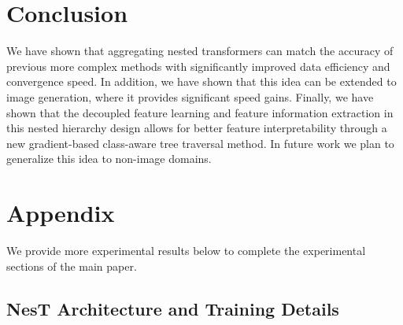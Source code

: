 \documentclass{article}
\newcommand{\OURS}{NesT\xspace}
\begin{document}
\section{Conclusion}
\label{sec:conclusion}
We have shown that aggregating nested transformers can match the accuracy of previous more complex methods with significantly improved data efficiency and convergence speed. 
In addition, we have shown that this idea can be extended to image generation, where it provides significant speed gains.
Finally, we have shown that the decoupled feature learning and feature information extraction in this nested hierarchy design allows for better feature interpretability through a new gradient-based class-aware tree traversal method.
In future work we plan to generalize this idea to non-image domains.





\newpage
\appendix

\section{Appendix}
\setcounter{table}{0}
\renewcommand{\thetable}{A\arabic{table}}
\setcounter{figure}{0}
\renewcommand{\thefigure}{A\arabic{figure}}

We provide more experimental results below to complete the experimental sections of the main paper.

\subsection{\OURS Architecture and Training Details}
\label{app:details}
\end{document}
